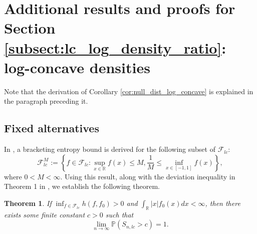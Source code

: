 \documentclass[12pt,letterpaper, twoside, openany]{article}
\theoremstyle{plain}
\newtheorem{theorem}{Theorem}[section]
\begin{document}
\section{Additional results and proofs for Section \ref{subsect:lc_log_density_ratio}: log-concave densities}
Note that the derivation of Corollary \ref{cor:null_dist_log_concave} is explained in the paragraph preceding it. 

\subsection{Fixed alternatives}
	In \cite{doss2016global}, a bracketing entropy bound is derived for the following subset of $\mathcal{F}_{lc}$:
		\begin{equation}\label{eq:def_FMlc}
			\mathcal{F}^M_{lc} :=  \left \{ f \in \mathcal{F}_{lc}: \sup_{x \in \mathbb{R}} f(x) \leq M, \frac{1}{M} \leq  \inf_{x \in [-1,1]} f(x) \right\}, %
		\end{equation}
		where $0 < M < \infty$. Using this result, along with the deviation inequality in Theorem 1 in  \cite{wong1995probability}, we establish the following theorem.
		\begin{theorem}\label{thm:log_concave_H1}
			If $\inf_{f \in \mathcal{F}_{lc}}h(f, f_0) > 0$ and 
   $\int_{\mathbb{R}} |x| f_0(x)dx < \infty$, then there exists some finite constant $c > 0$ such that
			\begin{equation*}
				\lim_{n\rightarrow \infty} \mathbb{P} ( S_{n,lc} > c)  = 1. 
			\end{equation*}
		\end{theorem}
		
		
		
		
\end{document}
